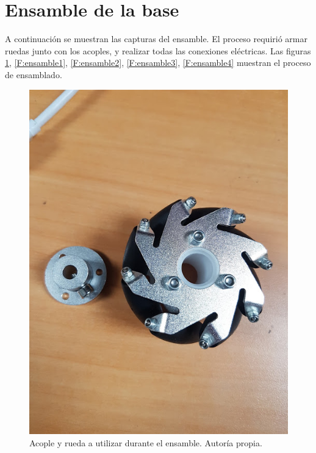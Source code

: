\newpage

\section{Ensamble de la base}

A continuación se muestran las capturas del ensamble. El proceso requirió armar ruedas junto con los acoples, y realizar todas las conexiones eléctricas. Las figuras \ref{F:ruedas}, \ref{F:ensamble1}, \ref{F:ensamble2}, \ref{F:ensamble3}, \ref{F:ensamble4} muestran el proceso de ensamblado.


\begin{figure}[H]
\centering
\includegraphics[scale=0.3]{imagenes/ruedas.jpg}
\caption{Acople y rueda a utilizar durante el ensamble. Autoría propia.}
\label{F:ruedas}
\end{figure}

